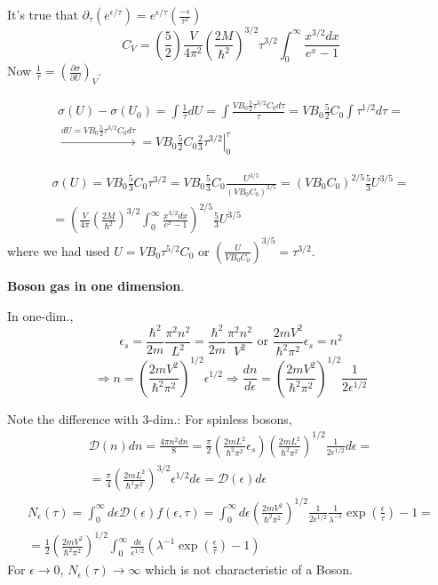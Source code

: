 It's true that $\partial_{\tau} ( e^{\epsilon/\tau} ) = e^{\epsilon/ \tau} \left( \frac{ -\epsilon}{\tau^2} \right)$
\[
C_V = \left( \frac{5}{2} \right) \frac{V}{4 \pi^2} \left( \frac{ 2M}{\hbar^2} \right)^{3/2} \tau^{3/2} \int_0^{\infty} \frac{ x^{3/2}dx}{ e^x  -1 }
\]
Now $\frac{1}{\tau} = \left( \frac{ \partial \sigma}{ \partial U} \right)_V$.  

\[
\begin{gathered}
  \sigma(U) - \sigma(U_0) = \int \frac{1}{\tau} dU =  \int \frac{ VB_0 \frac{5}{2} \tau^{3/2} C_0 d\tau }{ \tau} = VB_0 \frac{5}{2} C_0 \int \tau^{1/2} d\tau = \\ 
  \xrightarrow{ dU = VB_0 \frac{5}{2} \tau^{3/2} C_0 d\tau } = \left. VB_0 \frac{5}{2} C_0 \frac{2}{3} \tau^{3/2} \right|_0^{\tau}
\end{gathered}
\]

\[
\begin{gathered}
  \sigma(U) = VB_0 \frac{5}{3} C_0 \tau^{3/2} = VB_0 \frac{5}{3} C_0 \frac{U^{3/5}}{ (VB_0 C_0)^{3/5} } = (VB_0 C_0)^{2/5} \frac{5}{3} U^{3/5} = \\ 
  = \left( \frac{V}{4\pi} \left( \frac{2M}{ \hbar^2} \right)^{3/2} \int_0^{\infty} \frac{ x^{3/2} dx }{ e^x - 1 } \right)^{2/5} \frac{5}{3} U^{3/5}
\end{gathered}
\]
where we had used $U = VB_0 \tau^{5/2} C_0$ or $\left( \frac{ U}{VB_0 C_0 } \right)^{3/5} = \tau^{3/2}$.  

 \textbf{Boson gas in one dimension}. 

In one-dim., 
\[
\epsilon_s = \frac{ \hbar^2}{2m} \frac{ \pi^2 n^2}{L^2} = \frac{ \hbar^2}{2m } \frac{\pi^2 n ^2}{V^2} \text{ or } \frac{ 2 m V^2}{\hbar^2 \pi^2} \epsilon_s = n^2
\]
\[
\Longrightarrow n = \left( \frac{ 2 m V^2}{ \hbar^2 \pi^2} \right)^{1/2} \epsilon^{1/2} \Longrightarrow \frac{dn}{d\epsilon} = \left( \frac{ 2 m V^2}{ \hbar^2 \pi^2 } \right)^{1/2} \frac{1}{2 \epsilon^{1/2}}
\]

Note the difference with 3-dim.: For spinless bosons, 
\[
\begin{gathered}
\mathcal{D}(n) dn = \frac{ 4 \pi n^2 dn }{8} = \frac{\pi}{2} \left( \frac{ 2m L^2}{ \hbar^2 \pi^2} \epsilon_s \right) \left( \frac{ 2 mL^2}{ \hbar^2 \pi^2} \right)^{1/2} \frac{1}{2 \epsilon^{1/2}} d\epsilon = \\
= \frac{\pi}{4} \left( \frac{ 2 m L^2}{ \hbar^2 \pi^2} \right)^{3/2} \epsilon^{1/2} d\epsilon = \mathcal{D}(\epsilon) d\epsilon
\end{gathered}
\]
\[
\begin{gathered}
  N_{\epsilon}( \tau) = \int_0^{\infty} d\epsilon \mathcal{D}(\epsilon) f(\epsilon,\tau) = \int_0^{\infty} d\epsilon \left( \frac{ 2 m V^2}{ \hbar^2 \pi^2 } \right)^{1/2} \frac{1}{2\epsilon^{1/2}} \frac{ 1 }{ \lambda^{-1}} \exp{ \left( \frac{ \epsilon}{ \tau} \right) - 1 } =  \\
     = \frac{1}{2} \left( \frac{ 2 m V^2 }{ \hbar^2 \pi^2} \right)^{1/2} \int_0^{\infty} \frac{ d \epsilon}{ \epsilon^{1/2}} (\lambda^{-1} \exp{ \left( \frac{ \epsilon}{\tau} \right)} - 1 )
\end{gathered}
\]
For $\epsilon \to 0$, $N_{ \epsilon}(\tau) \to \infty$ which is not characteristic of a Boson.  



